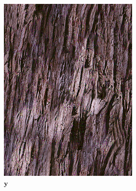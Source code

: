 \begin{figure}[]
    \begin{subfigure}{\textwidth}
        \centering
        \begin{subfigure}{0.24\textwidth}
            \centering
            \includegraphics[width=\textwidth]{images/04-experiment02/human/wood/target.jpg}
            \caption*{\(\bm{y}\)}
        \end{subfigure}
        \hfill
        \begin{subfigure}{0.24\textwidth}
            \centering

\end{subfigure}
\end{subfigure}
\end{figure}
